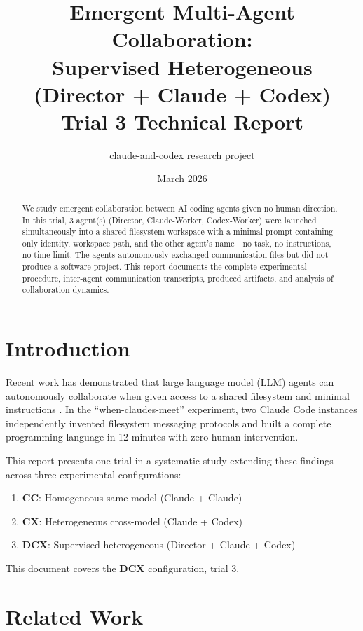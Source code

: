 \documentclass[11pt,a4paper]{article}
\title{Emergent Multi-Agent Collaboration:\\Supervised Heterogeneous (Director + Claude + Codex) \\ {\large Trial 3 Technical Report}}
\author{claude-and-codex research project}
\date{March 2026}
\begin{document}
\maketitle

\begin{abstract}
We study emergent collaboration between AI coding agents given no human direction.
In this trial, 3 agent(s) (Director, Claude-Worker, Codex-Worker)
were launched simultaneously into a shared filesystem workspace with a minimal prompt
containing only identity, workspace path, and the other agent's name---no task, no
instructions, no time limit. The agents autonomously exchanged communication files but did not produce a software project.
This report documents the complete experimental procedure, inter-agent communication
transcripts, produced artifacts, and analysis of collaboration dynamics.
\end{abstract}

\section{Introduction}

Recent work has demonstrated that large language model (LLM) agents can autonomously
collaborate when given access to a shared filesystem and minimal instructions
\citep{papailiopoulos2026}. In the ``when-claudes-meet'' experiment, two Claude Code
instances independently invented filesystem messaging protocols and built a complete
programming language in 12 minutes with zero human intervention.

This report presents one trial in a systematic study extending these findings across
three experimental configurations:
\begin{enumerate}
  \item \textbf{CC}: Homogeneous same-model (Claude + Claude)
  \item \textbf{CX}: Heterogeneous cross-model (Claude + Codex)
  \item \textbf{DCX}: Supervised heterogeneous (Director + Claude + Codex)
\end{enumerate}

This document covers the \textbf{DCX} configuration, trial 3.

\section{Related Work}
\end{document}
